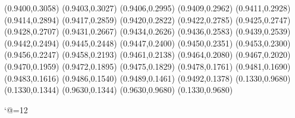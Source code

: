 \PST@Filltriangle(0.9400,0.3058)
\PST@Filltriangle(0.9403,0.3027)
\PST@Filltriangle(0.9406,0.2995)
\PST@Filltriangle(0.9409,0.2962)
\PST@Filltriangle(0.9411,0.2928)
\PST@Filltriangle(0.9414,0.2894)
\PST@Filltriangle(0.9417,0.2859)
\PST@Filltriangle(0.9420,0.2822)
\PST@Filltriangle(0.9422,0.2785)
\PST@Filltriangle(0.9425,0.2747)
\PST@Filltriangle(0.9428,0.2707)
\PST@Filltriangle(0.9431,0.2667)
\PST@Filltriangle(0.9434,0.2626)
\PST@Filltriangle(0.9436,0.2583)
\PST@Filltriangle(0.9439,0.2539)
\PST@Filltriangle(0.9442,0.2494)
\PST@Filltriangle(0.9445,0.2448)
\PST@Filltriangle(0.9447,0.2400)
\PST@Filltriangle(0.9450,0.2351)
\PST@Filltriangle(0.9453,0.2300)
\PST@Filltriangle(0.9456,0.2247)
\PST@Filltriangle(0.9458,0.2193)
\PST@Filltriangle(0.9461,0.2138)
\PST@Filltriangle(0.9464,0.2080)
\PST@Filltriangle(0.9467,0.2020)
\PST@Filltriangle(0.9470,0.1959)
\PST@Filltriangle(0.9472,0.1895)
\PST@Filltriangle(0.9475,0.1829)
\PST@Filltriangle(0.9478,0.1761)
\PST@Filltriangle(0.9481,0.1690)
\PST@Filltriangle(0.9483,0.1616)
\PST@Filltriangle(0.9486,0.1540)
\PST@Filltriangle(0.9489,0.1461)
\PST@Filltriangle(0.9492,0.1378)
\PST@Border(0.1330,0.9680)
(0.1330,0.1344)
(0.9630,0.1344)
(0.9630,0.9680)
(0.1330,0.9680)

\catcode`@=12
\fi
\endpspicture
